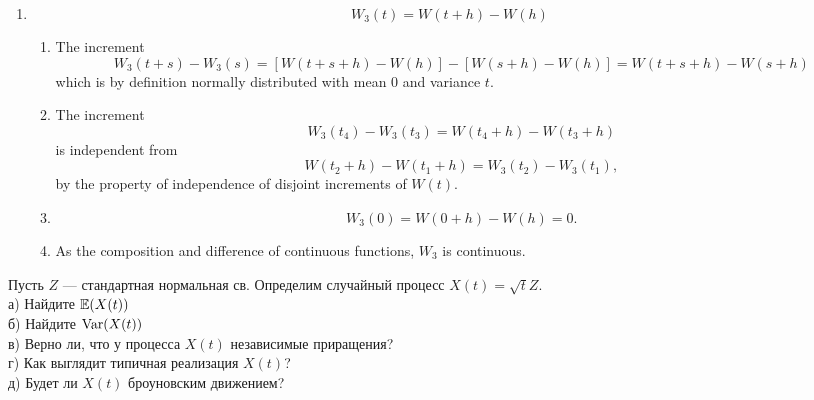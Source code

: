 \begin{solution}
\begin{enumerate}
  \item
  \[
      W_3(t) = W(t+h) - W(h)
  \]
  \begin{enumerate}
    \item
    The increment
    \[
        W_3(t+s) - W_3(s) = [ W(t+s+h) - W(h) ] - [ W(s+h) -
        W(h) ] = W(t+s+h) - W(s+h)
    \]
    which is by definition normally distributed with mean $
    0 $ and variance $ t $.

    \item
    The increment
    \[
        W_3(t_4) - W_3(t_3) = W(t_4+h) - W(t_3+h)
    \]
    is independent from
    \[
        W(t_2+h) - W(t_1+h) = W_3(t_2) - W_3(t_1),
    \]
    by the property of independence of disjoint increments
    of $ W(t) $.

    \item
    \[
        W_3(0) = W(0+h) - W(h) = 0.
    \]

    \item
    As the composition and difference of continuous
    functions, $ W_3 $ is continuous.
    \end{enumerate}
  \end{enumerate}

\end{solution}

\begin{problem}
Пусть $Z$ --- стандартная нормальная св. Определим случайный процесс $X(t)=\sqrt{t}Z$. \\
а) Найдите $\mathbb{E}(X(t))$ \\
б) Найдите $\operatorname{Var}(X(t))$ \\
в) Верно ли, что у процесса $X(t)$ независимые приращения? \\
г) Как выглядит типичная реализация $X(t)$? \\
д) Будет ли $X(t)$ броуновским движением? 
\end{problem} 
\begin{solution} 
\end{solution}




